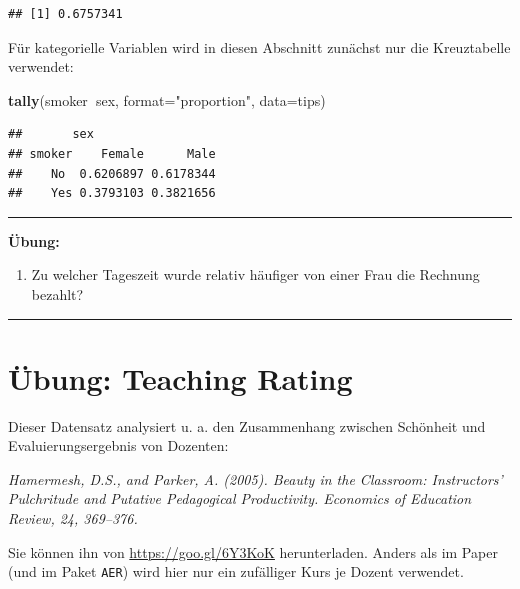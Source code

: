 \documentclass[12pt,ngerman,paper=a4,pagesize,DIV=13]{scrreprt}
\newenvironment{Shaded}{\begin{snugshade}}{\end{snugshade}}
\newcommand{\DataTypeTok}[1]{\textcolor[rgb]{0.13,0.29,0.53}{#1}}
\newcommand{\KeywordTok}[1]{\textcolor[rgb]{0.13,0.29,0.53}{\textbf{#1}}}
\newcommand{\NormalTok}[1]{#1}
\newcommand{\OperatorTok}[1]{\textcolor[rgb]{0.81,0.36,0.00}{\textbf{#1}}}
\newcommand{\StringTok}[1]{\textcolor[rgb]{0.31,0.60,0.02}{#1}}
\providecommand{\tightlist}{%
  \setlength{\itemsep}{0pt}\setlength{\parskip}{0pt}}
\begin{document}
\begin{verbatim}
## [1] 0.6757341
\end{verbatim}

Für kategorielle Variablen wird in diesen Abschnitt zunächst nur die
Kreuztabelle verwendet:

\begin{Shaded}
\begin{Highlighting}[]
\KeywordTok{tally}\NormalTok{(smoker}\OperatorTok{~}\NormalTok{sex, }\DataTypeTok{format=}\StringTok{"proportion"}\NormalTok{, }\DataTypeTok{data=}\NormalTok{tips)}
\end{Highlighting}
\end{Shaded}

\begin{verbatim}
##       sex
## smoker    Female      Male
##    No  0.6206897 0.6178344
##    Yes 0.3793103 0.3821656
\end{verbatim}

\begin{center}\rule{0.5\linewidth}{\linethickness}\end{center}

\textbf{Übung:}

\begin{enumerate}
\def\labelenumi{\arabic{enumi}.}
\setcounter{enumi}{8}
\tightlist
\item
  Zu welcher Tageszeit wurde relativ häufiger von einer Frau die
  Rechnung bezahlt?
\end{enumerate}

\begin{center}\rule{0.5\linewidth}{\linethickness}\end{center}

\hypertarget{ubung-teaching-rating-1}{%
\section{Übung: Teaching Rating}\label{ubung-teaching-rating-1}}

Dieser Datensatz analysiert u. a. den Zusammenhang zwischen Schönheit
und Evaluierungsergebnis von Dozenten:

\emph{Hamermesh, D.S., and Parker, A. (2005). Beauty in the Classroom:
Instructors' Pulchritude and Putative Pedagogical Productivity.
Economics of Education Review, 24, 369--376.}

Sie können ihn von \url{https://goo.gl/6Y3KoK} herunterladen. Anders als
im Paper (und im Paket \texttt{AER}) wird hier nur ein zufälliger Kurs
je Dozent verwendet.
\end{document}
